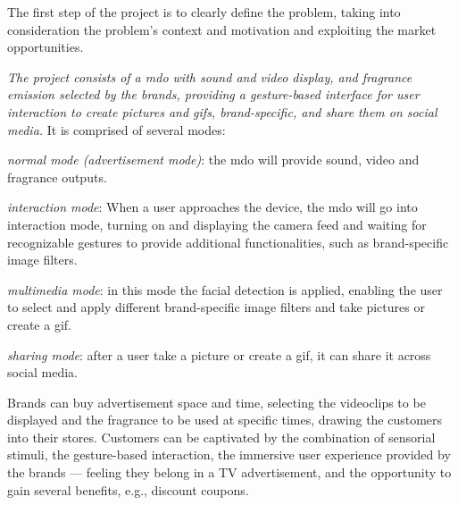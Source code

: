 The first step of the project is to clearly define the problem, taking into
consideration the problem's context and motivation and exploiting the market
opportunities.

\emph{The project consists of a \gls{mdo} with sound and
video display, and fragrance emission selected by the brands, providing a gesture-based interface for
user interaction to create pictures and \gls{gif}s, brand-specific, and share them on
social media.} It is comprised of several modes:
\begin{item-c}
\item \emph{normal mode (advertisement mode)}: the \gls{mdo} will provide
  sound, video and fragrance outputs.
\item \emph{interaction mode}: When a user approaches the device, the \gls{mdo} will
go into interaction mode, turning on and displaying the camera feed and waiting
for recognizable gestures to provide additional functionalities, such as
brand-specific image filters.
\item \emph{multimedia mode}: in this mode the facial detection is applied,
  enabling the user to select and apply different brand-specific image filters and take pictures or create a \gls{gif}.
\item \emph{sharing mode}: after a user take a picture or create a \gls{gif}, it
  can share it across social media.
\end{item-c}

Brands can buy advertisement space and time, selecting the videoclips to be
displayed and the fragrance to be used at specific times, drawing the customers
into their stores. Customers can be captivated by the combination of sensorial
stimuli, the gesture-based interaction, the immersive user experience provided
by the brands --- feeling they belong in a TV advertisement, and the opportunity
to gain several benefits, e.g., discount coupons.
